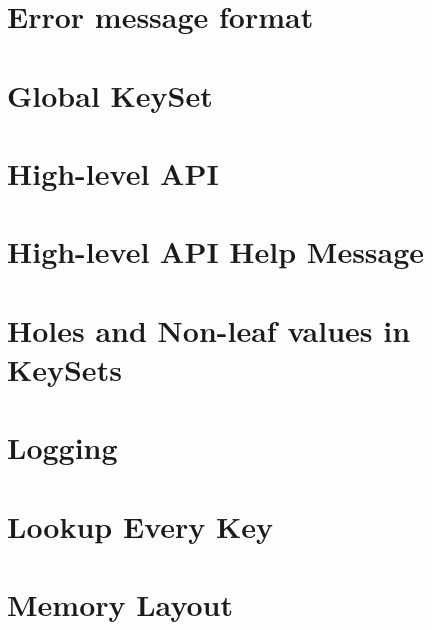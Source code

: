 \let\mypdfximage\pdfximage\def\pdfximage{\immediate\mypdfximage}\documentclass[twoside]{book}
\newcommand{\+}{\discretionary{\mbox{\scriptsize$\hookleftarrow$}}{}{}}
\begin{document}
\chapter{Error message format}
\label{doc_decisions_6_implemented_error_message_format_md}

\chapter{Global Key\+Set}
\label{doc_decisions_6_implemented_global_keyset_md}

\chapter{High-\/level API}
\label{doc_decisions_6_implemented_high_level_api_md}

\chapter{High-\/level API Help Message}
\label{doc_decisions_6_implemented_highlevel_help_message_md}

\chapter{Holes and Non-\/leaf values in Key\+Sets}
\label{doc_decisions_6_implemented_holes_md}

\chapter{Logging}
\label{doc_decisions_6_implemented_logging_md}

\chapter{Lookup Every Key}
\label{doc_decisions_6_implemented_lookup_every_key_md}

\chapter{Memory Layout}
\label{doc_decisions_6_implemented_memory_layout_md}

\end{document}
